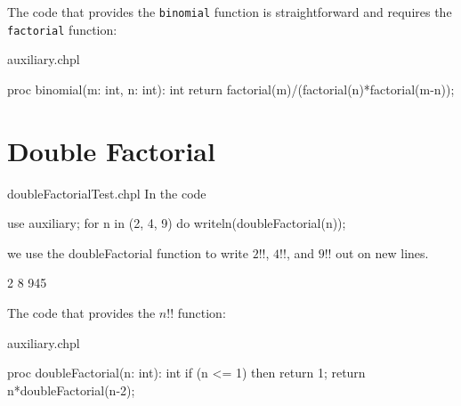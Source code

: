 The code that provides the \lstinline{binomial} function is straightforward 
and requires the \lstinline{factorial} function:
\begin{chapelsource}{auxiliary.chpl}
\begin{chapel}
proc binomial(m: int, n: int): int {
  return factorial(m)/(factorial(n)*factorial(m-n));
}
\end{chapel}
\end{chapelsource}


\section{Double Factorial}

\begin{chapeltest}{doubleFactorialTest.chpl}
In the code
\begin{chapelpre}
\end{chapelpre}
\begin{chapel}
use auxiliary;
for n in (2, 4, 9) do
  writeln(doubleFactorial(n));
\end{chapel}
we use the doubleFactorial function to write $2!!$, $4!!$, and $9!!$ out on new lines.
\begin{chapelpost}
\end{chapelpost}
\begin{chapeloutput}
2
8
945
\end{chapeloutput}
\end{chapeltest}

The code that provides the $n!!$ function:
\begin{chapelsource}{auxiliary.chpl}
\begin{chapel}
proc doubleFactorial(n: int): int{ 
  if (n <= 1) then return 1;
  return n*doubleFactorial(n-2);
}
\end{chapel}
\end{chapelsource}
